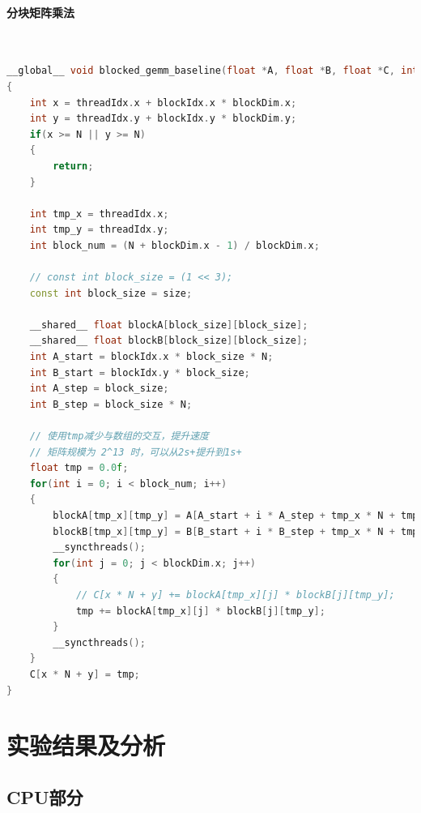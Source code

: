 \documentclass[UTF8]{article}
\begin{document}
    \paragraph*{分块矩阵乘法}\mbox{}\\
    \begin{lstlisting}[language=c++]
__global__ void blocked_gemm_baseline(float *A, float *B, float *C, int N)
{
    int x = threadIdx.x + blockIdx.x * blockDim.x;
    int y = threadIdx.y + blockIdx.y * blockDim.y;
    if(x >= N || y >= N)
    {
        return;
    }
    
    int tmp_x = threadIdx.x;
    int tmp_y = threadIdx.y;
    int block_num = (N + blockDim.x - 1) / blockDim.x;

    // const int block_size = (1 << 3);
    const int block_size = size;

    __shared__ float blockA[block_size][block_size];
    __shared__ float blockB[block_size][block_size];
    int A_start = blockIdx.x * block_size * N;
    int B_start = blockIdx.y * block_size;
    int A_step = block_size;
    int B_step = block_size * N;

    // 使用tmp减少与数组的交互，提升速度
    // 矩阵规模为 2^13 时，可以从2s+提升到1s+
    float tmp = 0.0f;
    for(int i = 0; i < block_num; i++)
    {
        blockA[tmp_x][tmp_y] = A[A_start + i * A_step + tmp_x * N + tmp_y];
        blockB[tmp_x][tmp_y] = B[B_start + i * B_step + tmp_x * N + tmp_y];
        __syncthreads();
        for(int j = 0; j < blockDim.x; j++)
        {
            // C[x * N + y] += blockA[tmp_x][j] * blockB[j][tmp_y];
            tmp += blockA[tmp_x][j] * blockB[j][tmp_y];
        }
        __syncthreads();
    }
    C[x * N + y] = tmp;
}
    \end{lstlisting}
    \section{实验结果及分析}
    \subsection{CPU部分}
\end{document}
